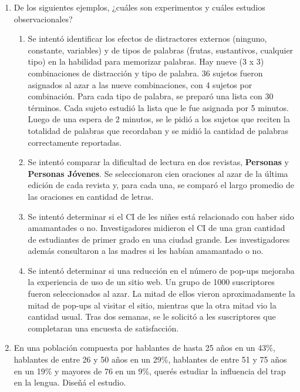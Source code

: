 \documentclass[authoryear,a4paper, 14pt]{scrartcl}
\begin{document}
\begin{enumerate}
    \item
        De los siguientes ejemplos, ¿cuáles son experimentos y cuáles estudios observacionales?
        \begin{enumerate}
            \item
                Se intentó identificar los efectos de distractores externos (ninguno, constante, variables) y de
                tipos de palabras (frutas, sustantivos, cualquier tipo) en la habilidad para memorizar palabras.
                Hay nueve (3 x 3) combinaciones de distracción y tipo de palabra. 36 sujetos fueron asignados al
                azar a las nueve combinaciones, con 4 sujetos por combinación. Para cada tipo de palabra, se preparó
                una lista con 30 términos. Cada sujeto estudió la lista que le fue asignada por 5 minutos. Luego de 
                una espera de 2 minutos, se le pidió a los sujetos que reciten la totalidad de palabras que
                recordaban y se midió la cantidad de palabras correctamente reportadas.
            \item
                Se intentó comparar la dificultad de lectura en dos revistas, \textbf{Personas} y \textbf{Personas
                Jóvenes}. Se seleccionaron cien oraciones al azar de la última edición de cada revista y, para cada
                una, se comparó el largo promedio de las oraciones en cantidad de letras.
            \item
                Se intentó determinar si el CI de les niñes está relacionado con haber sido amamantades o no. 
                Investigadores midieron el CI de una gran cantidad de estudiantes de primer grado en una ciudad 
                grande. Les investigadores además consultaron a las madres si les habían amamantado o no.
            \item
                Se intentó determinar si una reducción en el número de pop-ups mejoraba la experiencia de uso de un
                sitio web. Un grupo de 1000 suscriptores fueron seleccionados al azar. La mitad de ellos vieron
                aproximadamente la mitad de pop-ups al visitar el sitio, mientras que la otra mitad vio la cantidad
                usual. Tras dos semanas, se le solicitó a les suscriptores que completaran una encuesta de
                satisfacción.
            \end{enumerate}
    \item
        En una población compuesta por hablantes de hasta 25 años en un 43\%,
        hablantes de entre 26 y 50 años en un 29\%, hablantes de entre 51 y 75
        años en un 19\% y mayores de 76 en un 9\%, querés estudiar la
        influencia del trap en la lengua. Diseñá el estudio.
\end{enumerate}
\end{document}
